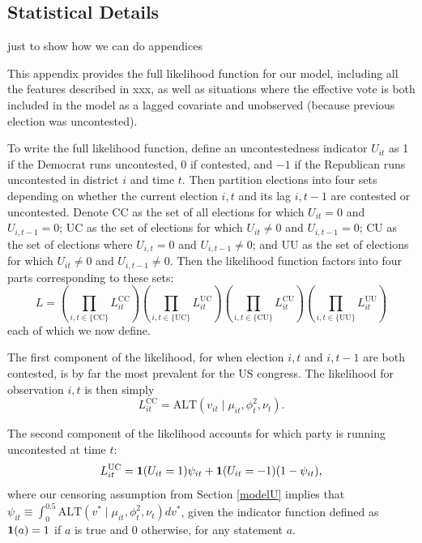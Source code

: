 \documentclass[12pt]{article}
\theoremstyle{definition}
\begin{document}
\begin{appendices}
\section{Statistical Details}\label{statdetail}

just to show how we can do appendices

This appendix provides the full likelihood function for our model, including all the features described in xxx, as well as situations where the effective vote is both included in the model as a lagged covariate and unobserved (because previous election was uncontested).

To write the full likelihood function, define an uncontestedness indicator $U_{it}$ as 1 if the Democrat runs uncontested, 0 if contested, and $-1$ if the Republican runs uncontested in district $i$ and time $t$.  Then partition elections into four sets depending on whether the current election $i,t$ and its lag $i,t-1$ are contested or uncontested.  Denote
CC as the set of all elections for which $U_{it}=0$ and $U_{i,t-1}=0$;
UC as the set of elections for which $U_{it}\ne 0$ and $U_{i,t-1}= 0$;
CU as the set of elections where $U_{i,t}= 0$ and $U_{i,t-1}\ne 0$;
and UU as the set of elections for which $U_{it}\ne 0$ and $U_{i,t-1}\ne 0$.
Then the likelihood function factors into four parts corresponding to these sets:
\begin{equation}\label{likelihood}
  L = \left(\prod_{i,t\in\{\text{CC}\}} L_{it}^{\text{CC}}\right)
  \left(\prod_{i,t\in\{\text{UC}\}} L_{it}^{\text{UC}}\right)
  \left(\prod_{i,t\in\{\text{CU}\}} L_{it}^{\text{CU}}\right)
  \left(\prod_{i,t\in\{\text{UU}\}} L_{it}^{\text{UU}}\right)
\end{equation}
each of which we now define.

The first component of the likelihood, for when election $i,t$ and $i,t-1$ are both contested, is by far the most prevalent for the US congress.  The likelihood for observation $i,t$ is then simply
\begin{equation}\label{cc}
  L_{it}^{\text{CC}} = \text{ALT}(v_{it}\mid\mu_{it},\phi_t^2,\nu_t).
\end{equation}

The second component of the likelihood accounts for which party is running uncontested at time $t$:
\begin{equation}\label{cu}
  L_{it}^{\text{UC}} = {\bf 1}(U_{it}=1)\psi_{it} + {\bf 1}(U_{it}=-1)(1-\psi_{it}),
\end{equation}
where our censoring assumption from Section \ref{modelU} implies that $\psi_{it}\equiv\int_0^{0.5}\text{ALT}(v^*\mid\mu_{it},\phi_t^2,\nu_t)dv^*$, given the indicator function defined as ${\bf 1}(a)=1$ if $a$ is true and 0 otherwise, for any statement $a$.


\end{appendices}
\end{document}
